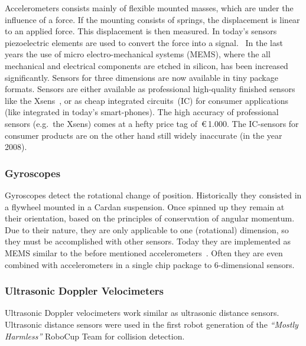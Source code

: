 \documentclass[12pt,a4paper]{article}
\newcommand{\MH}{\emph{``Mostly Harmless''} RoboCup Team\xspace}
\begin{document}
Accelerometers consists mainly of flexible mounted masses, which are under the influence of a force.
If the mounting consists of springs, the displacement is linear to an applied force.
This displacement is then measured.
In today's sensors piezoelectric elements are used to convert the force into a signal.~\cite{emt}
In the last years the use of micro electro-mechanical systems (MEMS), where the all mechanical and electrical components are etched in silicon, has been increased significantly.
Sensors for three dimensions are now available in tiny package formats.
Sensors are either available as professional high-quality finished sensors like the Xsens~\cite{xsens}, or as cheap integrated circuits~(IC) for consumer applications (like integrated in today's smart-phones).
The high accuracy of professional sensors (e.g.\ the Xsens) comes at a hefty price tag of~\euro\,1.000.
The IC-sensors for consumer products are on the other hand still widely inaccurate (in the year 2008).


\subsubsection{Gyroscopes}

Gyroscopes detect the rotational change of position.
Historically they consisted in a flywheel mounted in a Cardan suspension.
Once spinned up they remain at their orientation, based on the principles of conservation of angular momentum.\\
Due to their nature, they are only applicable to one (rotational) dimension, so they must be accomplished with other sensors.
Today they are implemented as MEMS similar to  the before mentioned accelerometers~\cite{pmt}.
Often they are even combined with accelerometers in a single chip package to 6-dimensional sensors.


\subsubsection{Ultrasonic Doppler Velocimeters}

Ultrasonic Doppler velocimeters work similar as ultrasonic distance sensors.
Ultrasonic distance sensors were used in the first robot generation of the \MH for collision detection.
\end{document}
